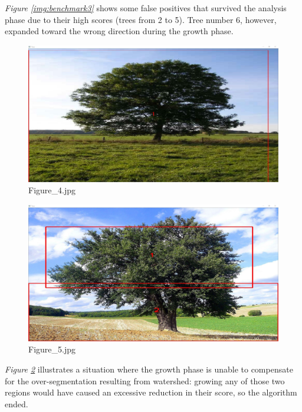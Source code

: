 \documentclass{article}
\begin{document}
\textit{Figure \ref{img:benchmark3}} shows some false positives that survived the analysis phase due to their high scores (trees from 2 to 5). Tree number 6, however, expanded toward the wrong direction during the growth phase.

\begin{figure}[h]
\begin{center}
\includegraphics[width=1\textwidth]{images/b4}
\caption{\footnotesize{Figure\_4.jpg}}
\label{img:benchmark4}
\end{center}
\end{figure}

\begin{figure}[h]
\begin{center}
\includegraphics[width=1\textwidth]{images/b5}
\caption{\footnotesize{Figure\_5.jpg}}
\label{img:benchmark5}
\end{center}
\end{figure}

\textit{Figure \ref{img:benchmark5}} illustrates a situation where the growth phase is unable to compensate for the over-segmentation resulting from watershed: growing any of those two regions would have caused an excessive reduction in their score, so the algorithm ended.
\end{document}
